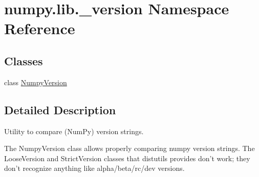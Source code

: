 \hypertarget{namespacenumpy_1_1lib_1_1__version}{}\section{numpy.\+lib.\+\_\+version Namespace Reference}
\label{namespacenumpy_1_1lib_1_1__version}
\subsection*{Classes}
\begin{DoxyCompactItemize}
\item 
class \hyperlink{classnumpy_1_1lib_1_1__version_1_1NumpyVersion}{Numpy\+Version}
\end{DoxyCompactItemize}


\subsection{Detailed Description}
\begin{DoxyVerb}Utility to compare (NumPy) version strings.

The NumpyVersion class allows properly comparing numpy version strings.
The LooseVersion and StrictVersion classes that distutils provides don't
work; they don't recognize anything like alpha/beta/rc/dev versions.\end{DoxyVerb}
 